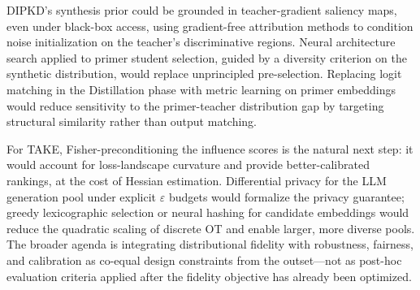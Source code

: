 \begin{foldable}
  DIPKD's synthesis prior could be grounded in teacher-gradient saliency maps, even under black-box access, using gradient-free attribution methods to condition noise initialization on the teacher's discriminative regions.
  Neural architecture search applied to primer student selection, guided by a diversity criterion on the synthetic distribution, would replace unprincipled pre-selection.
  Replacing logit matching in the Distillation phase with metric learning on primer embeddings would reduce sensitivity to the primer-teacher distribution gap by targeting structural similarity rather than output matching.
\end{foldable}

\begin{foldable}
  For TAKE, Fisher-preconditioning the influence scores is the natural next step: it would account for loss-landscape curvature and provide better-calibrated rankings, at the cost of Hessian estimation.
  Differential privacy for the \ac{LLM} generation pool under explicit $\varepsilon$ budgets would formalize the privacy guarantee; greedy lexicographic selection or neural hashing for candidate embeddings would reduce the quadratic scaling of discrete \ac{OT} and enable larger, more diverse pools.
  The broader agenda is integrating distributional fidelity with robustness, fairness, and calibration as co-equal design constraints from the outset---not as post-hoc evaluation criteria applied after the fidelity objective has already been optimized.
\end{foldable}
